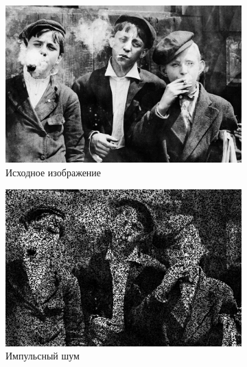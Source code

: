   \begin{figure}[ht] 
    \centering
    \begin{subfigure}[b]{0.5\linewidth}
        \centering
        \includegraphics[width=0.95\linewidth]{../lewis-hine-taschen-main-3.jpg} 
        \caption{Исходное изображение} 
        \label{contraharmonic_-0.5:a} 
        \vspace{4ex}
    \end{subfigure}%
    \begin{subfigure}[b]{0.5\linewidth}
      \centering
      \includegraphics[width=0.95\linewidth]{../Contraharmonic_Filter/Contraharmonic_Impulse_noise_(m,n=(3,_3),q=-0.5).jpg} 
      \caption{Импульсный шум} 
      \label{contraharmonic_-0.5:b} 
      \vspace{4ex}
    \end{subfigure}
    \begin{subfigure}[b]{0.5\linewidth}
      \centering

\end{subfigure}
\end{figure}
